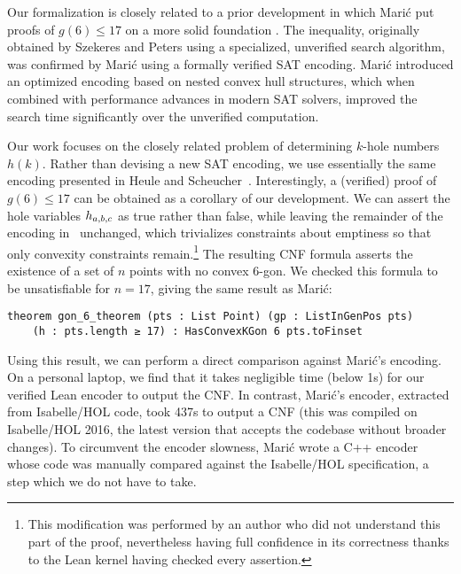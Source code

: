 Our formalization is closely related to a prior development
in which Marić put proofs of $g(6) \leq 17$ on a more solid foundation \cite{19maric_fast_formal_proof_erdos_szekeres_conjecture_convex_polygons_most_six_points}.
The inequality,
originally obtained by Szekeres and Peters \cite{06szekeres_computer_solution_17_point_erdos_szekeres_problem}
using a specialized, unverified search algorithm,
was confirmed by Marić using a formally verified SAT encoding.
Marić introduced an optimized encoding based on nested convex hull structures,
which when combined with performance advances in modern SAT solvers,
improved the search time significantly over the unverified computation.

Our work focuses on the closely related problem
of determining $k$-hole numbers $h(k)$.
Rather than devising a new SAT encoding,
we use essentially the same encoding presented in Heule and Scheucher~\cite{emptyHexagonNumber}.
Interestingly,
a (verified) proof of $g(6) \leq 17$ can be obtained
as a corollary of our development.
We can assert the hole variables $\hvar_{a,b,c}$ as true rather than false,
while leaving the remainder of the encoding in~ unchanged,
which trivializes constraints about emptiness
so that only convexity constraints remain.\footnote{
This modification was performed by an author
who did not understand this part of the proof,
nevertheless having full confidence in its correctness
thanks to the Lean kernel having checked every assertion.}
The resulting CNF formula
asserts the existence of a set of $n$ points
with no convex $6$-gon.
We checked this formula to be unsatisfiable for $n = 17$,
giving the same result as Marić:
\begin{lstlisting}
theorem gon_6_theorem (pts : List Point) (gp : ListInGenPos pts)
    (h : pts.length ≥ 17) : HasConvexKGon 6 pts.toFinset
\end{lstlisting}

Using this result,
we can perform a direct comparison against Marić's encoding.
On a personal laptop,
we find that it takes negligible time (below 1s)
for our verified Lean encoder to output the CNF.
In contrast,
Marić's encoder, extracted from Isabelle/HOL code,
took 437s to output a CNF
(this was compiled on Isabelle/HOL 2016,
the latest version that accepts the codebase without broader changes).
To circumvent the encoder slowness,
Marić wrote a C++ encoder
whose code was manually compared against the Isabelle/HOL specification,
a step which we do not have to take.

